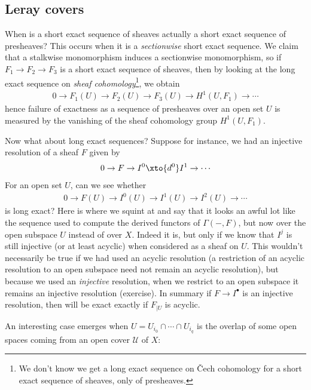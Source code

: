 \documentclass[11pt]{amsart}
\begin{document}
\subsection{Leray covers}
When is a short exact sequence of sheaves actually a short exact sequence of presheaves? This occurs when it is a \emph{sectionwise} short exact sequence. We claim that a stalkwise monomorphism induces a sectionwise monomorphism, so if $F_1 \to F_2 \to F_3$ is a short exact sequence of sheaves, then by looking at the long exact sequence on \emph{sheaf cohomology}\footnote{We don't know we get a long exact sequence on \v{C}ech cohomology for a short exact sequence of sheaves, only of presheaves.}, we obtain
\begin{align*}
    0 \to F_1(U) \to F_2(U) \to F_3(U) \to H^1(U,F_1) \to \cdots 
\end{align*}
hence failure of exactness as a sequence of presheaves over an open set $U$ is measured by the vanishing of the sheaf cohomology group $H^1(U,F_1)$.

Now what about long exact sequences? Suppose for instance, we had an injective resolution of a sheaf $F$ given by
\begin{align*}
    0 \to F \to I^0 \xto{d^0} I^1 \to \cdots
\end{align*}
For an open set $U$, can we see whether
\begin{equation}\label{eqn:acyclic-resolution-on-U}
\begin{aligned}
    0 \to F(U) \to I^0(U) \to I^1(U) \to I^2(U) \to \cdots
\end{aligned}
\end{equation}
is long exact? Here is where we squint at  and say that it looks an awful lot like the sequence used to compute the derived functors of $\Gamma(-,F)$, but now over the open subspace $U$ instead of over $X$. Indeed it is, but only if we know that $I^j$ is still injective (or at least acyclic) when considered as a sheaf on $U$. This wouldn't necessarily be true if we had used an acyclic resolution (a restriction of an acyclic resolution to an open subspace need not remain an acyclic resolution), but because we used an \emph{injective} resolution, when we restrict to an open subspace it remains an injective resolution (exercise). In summary if $F \to I^\bullet$ is an injective resolution, then  will be exact exactly if $F_{|U}$ is acyclic.

An interesting case emerges when $U = U_{i_0}\cap \cdots \cap U_{i_q}$ is the overlap of some open spaces coming from an open cover $\mathcal{U}$ of $X$:
\end{document}

